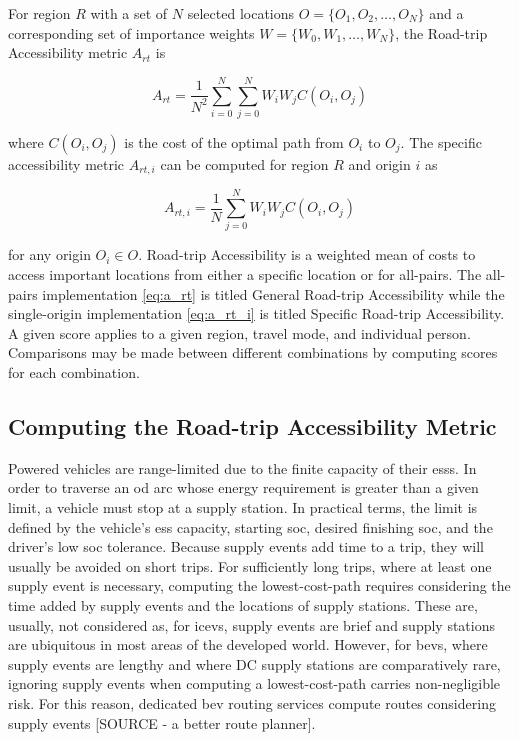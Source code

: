 \documentclass[11pt]{article}
\begin{document}
\begin{multicols}{2}
For region $R$ with a set of $N$ selected locations $O = \{O_1, O_2, \dots, O_N\}$ and a corresponding set of importance weights $W = \{W_0, W_1, \dots, W_N\}$, the Road-trip Accessibility metric $A_{rt}$ is

\begin{equation}
	A_{rt} = \frac{1}{N^2}\sum_{i = 0}^{N} \sum_{j = 0 }^{N} W_iW_jC(O_i, O_j) \label{eq:a_rt}
\end{equation}

\noindent where $C(O_i, O_j) $ is the cost of the optimal path from $O_i$ to $O_j$. The specific accessibility metric $A_{rt,i}$ can be computed for region $R$ and origin $i$ as

\begin{equation}
	A_{rt,i} = \frac{1}{N}\sum_{j = 0 }^{N} W_iW_jC(O_i, O_j) \label{eq:a_rt_i}
\end{equation}

for any origin $O_i \in O$. Road-trip Accessibility is a weighted mean of costs to access important locations from either a specific location or for all-pairs. The all-pairs implementation \eqref{eq:a_rt} is titled General Road-trip Accessibility while the single-origin implementation \eqref{eq:a_rt_i} is titled Specific Road-trip Accessibility. A given score applies to a given region, travel mode, and individual person. Comparisons may be made between different combinations by computing scores for each combination.

\subsection*{Computing the Road-trip Accessibility Metric}

Powered vehicles are range-limited due to the finite capacity of their \glspl{ess}. In order to traverse an \gls{od} arc whose energy requirement is greater than a given limit, a vehicle must stop at a supply station. In practical terms, the limit is defined by the vehicle's \gls{ess} capacity, starting \gls{soc}, desired finishing \gls{soc}, and the driver's low \gls{soc} tolerance. Because supply events add time to a trip, they will usually be avoided on short trips. For sufficiently long trips, where at least one supply event is necessary, computing the lowest-cost-path requires considering the time added by supply events and the locations of supply stations. These are, usually, not considered as, for \glspl{icev}, supply events are brief and supply stations are ubiquitous in most areas of the developed world. However, for \glspl{bev}, where supply events are lengthy and where DC supply stations are comparatively rare, ignoring supply events when computing a lowest-cost-path carries non-negligible risk. For this reason, dedicated \gls{bev} routing services compute routes considering supply events [SOURCE  - a better route planner].


\end{multicols}
\end{document}
